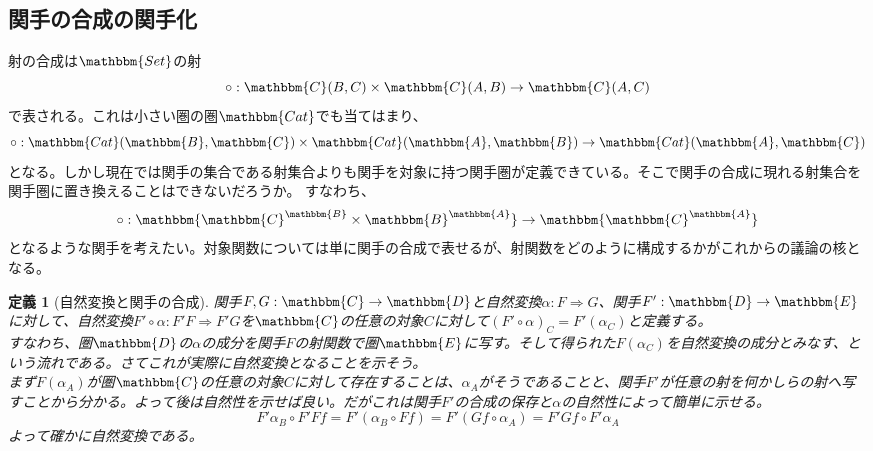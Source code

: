 \documentclass[uplatex,dvipdfmx]{jsarticle}
\newcommand{\cat}[1]{\mathbbm{#1}}
\newcommand{\arrow}{\rightarrow}
\newcommand{\functor}[3]{#1:\cat{#2}\arrow \cat{#3}}
\newcommand{\nat}[3]{#1:#2\Rightarrow #3}
\newcommand{\mor}[3]{#1:#2\arrow #3}
\newcommand{\arset}[3]{\cat{#1}(#2,#3)}
\newcommand{\funccat}[2]{\cat{#2}^\cat{#1}}
\newtheorem{define}{定義}[section]
\numberwithin{proof}{subsection}
\numberwithin{prop}{subsection}
\numberwithin{define}{subsection}
\begin{document}
  \subsection{関手の合成の関手化}
  射の合成は$\cat{Set}$の射\[\mor{\circ}{\arset{C}{B}{C}\times\arset{C}{A}{B}}{\arset{C}{A}{C}}\]で表される。これは小さい圏の圏$\cat{Cat}$でも当てはまり、\[\mor{\circ}{\arset{Cat}{\cat{B}}{\cat{C}}\times\arset{Cat}{\cat{A}}{\cat{B}}}{\arset{Cat}{\cat{A}}{\cat{C}}}\]となる。しかし現在では関手の集合である射集合よりも関手を対象に持つ関手圏が定義できている。そこで関手の合成に現れる射集合を関手圏に置き換えることはできないだろうか。
  すなわち、\[\functor{\circ}{\funccat{B}{C}\times\funccat{A}{B}}{\funccat{A}{C}}\]となるような関手を考えたい。対象関数については単に関手の合成で表せるが、射関数をどのように構成するかがこれからの議論の核となる。
  \begin{define}[自然変換と関手の合成]
    関手$\functor{F,G}{C}{D}$と自然変換$\nat{\alpha}{F}{G}$、関手$\functor{F'}{D}{E}$に対して、自然変換$\nat{F'\circ\alpha}{F'F}{F'G}$を$\cat{C}$の任意の対象$C$に対して$(F'\circ\alpha)_C=F'(\alpha_C)$と定義する。\\
    すなわち、圏$\cat{D}$の$\alpha$の成分を関手$F$の射関数で圏$\cat{E}$に写す。そして得られた$F(\alpha_C)$を自然変換の成分とみなす、という流れである。さてこれが実際に自然変換となることを示そう。\\
    まず$F(\alpha_A)$が圏$\cat{C}$の任意の対象$C$に対して存在することは、$\alpha_A$がそうであることと、関手$F'$が任意の射を何かしらの射へ写すことから分かる。よって後は自然性を示せば良い。だがこれは関手$F'$の合成の保存と$\alpha$の自然性によって簡単に示せる。
    \[F'\alpha_B\circ F'Ff=F'(\alpha_B\circ Ff)=F'(Gf\circ\alpha_A)=F'Gf\circ F'\alpha_A\]よって確かに自然変換である。
    \begin{center}
\end{center}
\end{define}
\end{document}
